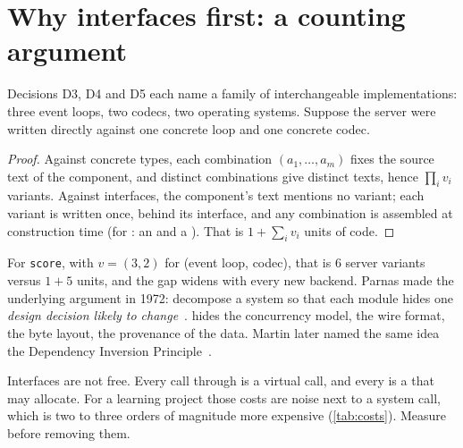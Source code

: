 \section{Why interfaces first: a counting argument}
Decisions D3, D4 and D5 each name a family of interchangeable implementations: three event loops, two
codecs, two operating systems. Suppose the server were written directly against one concrete loop and one concrete codec.

\begin{proof}
Against concrete types, each combination $(a_1,\dots,a_m)$ fixes the source text of the component, and distinct
combinations give distinct texts, hence $\prod_i v_i$ variants. Against interfaces, the component's text mentions no
variant; each variant is written once, behind its interface, and any combination is assembled at construction time
(for : an  and a ). That is $1+\sum_i v_i$ units of code.
\end{proof}

For \texttt{score}, with $v=(3,2)$ for (event loop, codec), that is $6$ server variants versus $1+5$ units, and the gap
widens with every new backend. Parnas made the underlying argument in 1972: decompose a system so that each module
hides one \emph{design decision likely to change}~\cite{parnas1972criteria}.  hides the concurrency model,
 the wire format,  the byte layout,  the provenance of the data.
Martin later named the same idea the Dependency Inversion Principle~\cite{martin2003agile}.

\begin{remarkbox}
Interfaces are not free. Every call through  is a virtual call, and every  is a
 that may allocate. For a learning project those costs are noise next to a system call, which is
two to three orders of magnitude more expensive (\cref{tab:costs}). Measure before removing them.
\end{remarkbox}

